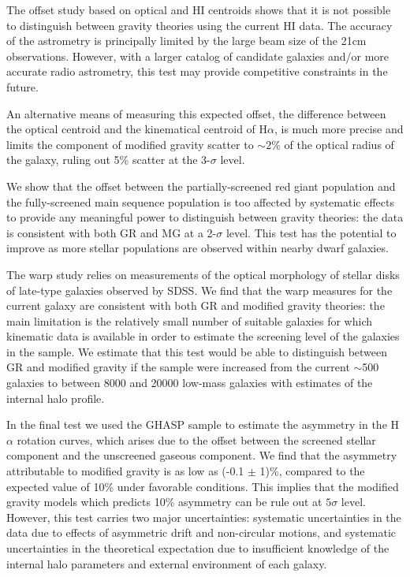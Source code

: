 \documentclass[useAMS,usenatbib,twocolumn]{mn2e}
\newcommand{\ha}{H$\alpha$}
\begin{document}
The offset study based on optical and HI centroids shows that it is not
possible to distinguish between gravity theories using the current HI data. 
The accuracy of the astrometry is principally limited by the large beam size of
the 21cm observations.  However, with a larger catalog of candidate
galaxies and/or more accurate radio astrometry, this test may provide
competitive constraints in the future.

An alternative means of measuring this expected offset, the difference
between the optical centroid and the kinematical centroid of \ha{}, is
much more precise and limits the component of modified gravity scatter
to  $\sim 2$\% of the optical radius of the galaxy, ruling out 5\%
scatter at the 3-$\sigma$ level.

We show that the offset between the partially-screened red giant
population and the fully-screened main sequence population is too
affected by systematic effects to provide any meaningful power to distinguish
between gravity theories: the data is consistent with both GR and MG at
a 2-$\sigma$ level.  This test has the potential to improve as more stellar
populations are observed within nearby dwarf galaxies.

The warp study relies on measurements of the optical morphology of stellar
disks of late-type galaxies observed by SDSS.
We find that the warp measures for the current galaxy are
consistent with both GR and modified gravity theories: the main limitation
is the relatively small number of suitable galaxies for which kinematic data
is available in order to estimate the screening level of the galaxies in
the sample.  We estimate that this test would be able to
distinguish between GR and modified gravity if the sample were increased
from the current $\sim$500 galaxies to between 8000 and 20000 low-mass
galaxies with estimates of the internal halo profile.

In the final test we used the GHASP sample to estimate
the asymmetry in the \ha{} rotation curves, which arises due to the
offset between the screened stellar component and the unscreened gaseous
component. We find that the asymmetry attributable to modified gravity is as
low as (-0.1 $\pm$ 1)\%, compared to the expected value of 10\% under
favorable conditions.
This implies that the modified gravity models which predicts 10\%
asymmetry can be rule out at $5 \sigma$ level. However, this test carries two
major uncertainties: systematic uncertainties in the data due to effects of
asymmetric drift and non-circular motions, and systematic uncertainties in
the theoretical expectation due to insufficient knowledge of the internal
halo parameters and external environment of each galaxy.
\end{document}
